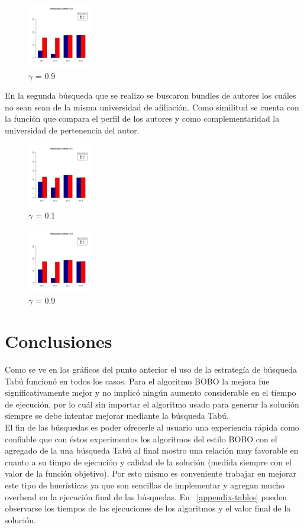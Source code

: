 \begin{figure}[H]
	\centering
	\includegraphics[width=0.25\textwidth]{img/gamma09.png}
	\caption{$\gamma$ = 0.9}
	\label{res:img-gamma09-papers}
\end{figure}
En la segunda búsqueda que se realizo se buscaron bundles de autores los cuáles no sean sean de la misma universidad de afiliación. Como similitud se cuenta con la función que compara el perfil de los autores y como complementaridad la universidad de pertenencia del autor.
\begin{figure}[H]
	\centering
	\includegraphics[width=0.25\textwidth]{img/gamma01-autores.png}
	\caption{$\gamma$ = 0.1}
	\label{res:img-gamma01-authors}
\end{figure}

\begin{figure}[H]
	\centering
	\includegraphics[width=0.25\textwidth]{img/gamma09-autores.png}
	\caption{$\gamma$ = 0.9}
	\label{res:img-gamma09-authors}
\end{figure}
\section{Conclusiones}
Como se ve en los gráficos del punto anterior el uso de la estrategía de búsqueda Tabú funcionó en todos los casos. Para el algoritmo BOBO la mejora fue significativamente mejor y no implicó ningún aumento considerable en el tiempo de ejecución, por lo cuál sin importar el algoritmo usado para generar la solución siempre se debe intentar mejorar mediante la búsqueda Tabú.\\
El fin de las búsquedas es poder ofrecerle al usuario una experiencia rápida como confiable que con éstos experimentos los algoritmos del estilo BOBO con el agregado de la una búsqueda Tabú al final mostro una relación muy favorable en cuanto a su timpo de ejecución y calidad de la solución (medida siempre con el valor de la función objetivo). Por esto mismo es conveniente trabajar en mejorar este tipo de huerísticas ya que son sencillas de implementar y agregan mucho overhead en la ejecución final de las búsquedas. En ~\ref{appendix-tables} pueden observarse los tiempos de las ejecuciones de los algoritmos y el valor final de la solución.
